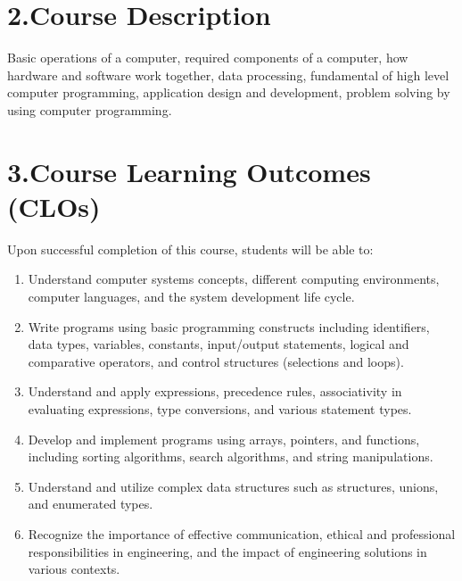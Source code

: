 \documentclass[11pt,a4paper]{article}
\begin{document}
\section*{2.\quad Course Description}
Basic operations of a computer, required components of a computer, how hardware
and software work together, data processing, fundamental of high level computer
programming, application design and development, problem solving by using
computer programming.

\section*{3.\quad Course Learning Outcomes (CLOs)}
Upon successful completion of this course, students will be able to:
\begin{enumerate}
  \item Understand computer systems concepts, different computing environments,
        computer languages, and the system development life cycle.
  \item Write programs using basic programming constructs including identifiers,
        data types, variables, constants, input/output statements, logical and
        comparative operators, and control structures (selections and loops).
  \item Understand and apply expressions, precedence rules, associativity in
        evaluating expressions, type conversions, and various statement types.
  \item Develop and implement programs using arrays, pointers, and functions,
        including sorting algorithms, search algorithms, and string manipulations.
  \item Understand and utilize complex data structures such as structures, unions,
        and enumerated types.
  \item Recognize the importance of effective communication, ethical and
        professional responsibilities in engineering, and the impact of engineering
        solutions in various contexts.
\end{enumerate}

\end{document}
